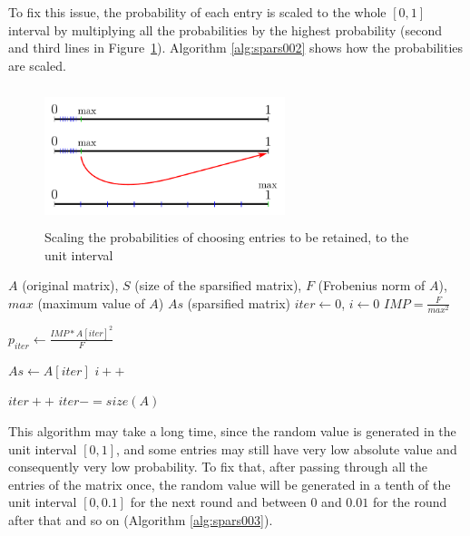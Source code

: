 To fix this issue, the probability of each entry is scaled to the whole $[0,1]$ interval by multiplying all the probabilities
by the highest probability (second and third lines in Figure~\ref{fig:spars001}). Algorithm \ref{alg:spars002} shows
how the probabilities are scaled.

\begin{figure}[tbh]
 \centering
 \includegraphics[width=7cm,height=4cm]{./figures/spars001.pdf}
 \caption{Scaling the probabilities of choosing entries to be retained, to the unit interval}
 \label{fig:spars001}
\end{figure}

\begin{algorithm}[H] 
  \footnotesize
  \caption{$As = Sparsify(A, S, F, max)$} \label{alg:spars002} 
  \begin{algorithmic}[1]
    \Require $A$ (original matrix), $S$ (size of the sparsified matrix), $F$ (Frobenius norm of $A$), $max$ (maximum value of $A$) 
    \Ensure  $As$ (sparsified matrix)
    \State $iter \leftarrow 0$, $i \leftarrow 0$
    \State $IMP = \frac{F}{max^2}$ 
    
      \State $p_{iter} \leftarrow \frac{IMP * A[iter]^2}{F}$ 
      
	\State $As \leftarrow A[iter]$
	\State $i++$
      \EndIf
      
      \State $iter++$
	\State $iter -= size(A)$
      \EndIf
      
    \EndWhile
  \end{algorithmic}
\end{algorithm}

This algorithm may take a long time, since the random value is generated in the unit interval $[0,1]$,
and some entries may still have very low absolute value and consequently very low probability.  
To fix that, after passing through all the entries of the matrix once, the random value will be generated in a tenth
of the unit interval $[0,0.1]$ for the next round and between $0$ and $0.01$ for the round after
that and so on (Algorithm \ref{alg:spars003}).

